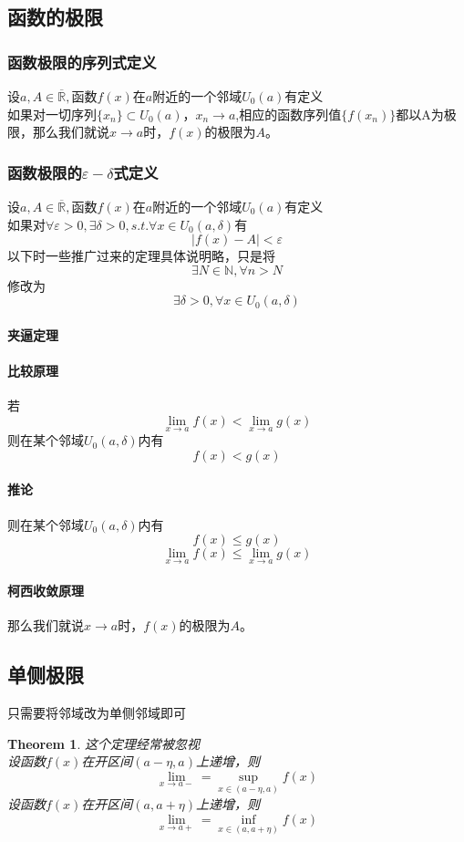 \documentclass[11pt,hyperref,a4paper,UTF8]{ctexart}
\newtheorem{theorem}{Theorem}[subsection]
\begin{document}
\begin{CJK}{UTF8}{gkai}
\subsection{函数的极限}
\subsubsection{函数极限的序列式定义}
设$a,A\in\overline{\mathbb{R}},$函数$f(x)$在$a$附近的一个邻域$U_0(a)$有定义\\
如果对一切序列$\{x_n\}\subset U_0(a)$，$x_n\to a$,相应的函数序列值$\{f(x_n)\}$都以A为极限，那么我们就说$x\to a $时，$f(x)$的极限为$A$。

\subsubsection{函数极限的$\varepsilon-\delta$式定义}
设$a,A\in\overline{\mathbb{R}},$函数$f(x)$在$a$附近的一个邻域$U_0(a)$有定义\\
如果对$\forall \varepsilon >0,\exists \delta>0,s.t. \forall x\in U_0(a,\delta)$有
\[|f(x)-A|<\varepsilon\]
以下时一些推广过来的定理具体说明略，只是将
\[\exists N\in \mathbb{N},\forall n>N\]
修改为
\[\exists \delta>0,\forall x\in U_0(a,\delta)\]
\paragraph{夹逼定理\\}
\paragraph{比较原理\\}
若
\[\lim_{x\to a} f(x)<\lim_{x\to a} g(x)\]
则在某个邻域$U_0(a,\delta)$内有
\[f(x)<g(x)\]

\paragraph{推论\\}
则在某个邻域$U_0(a,\delta)$内有
\[f(x)\leq g(x)\]
\[\lim_{x\to a} f(x)\leq \lim_{x\to a} g(x)\]
\paragraph{柯西收敛原理\\}
那么我们就说$x\to a $时，$f(x)$的极限为$A$。
\subsection{单侧极限}
只需要将邻域改为单侧邻域即可\\
\begin{theorem}
这个定理经常被忽视\\
设函数$f(x)$在开区间$(a-\eta,a)$上递增，则
\[\lim_{x\to a-}=\sup_{x\in (a-\eta,a)}f(x)\]
设函数$f(x)$在开区间$(a,a+\eta)$上递增，则
\[\lim_{x\to a+}=\inf_{x\in (a,a+\eta)}f(x)\]
\end{theorem}

\end{CJK}
\end{document}
